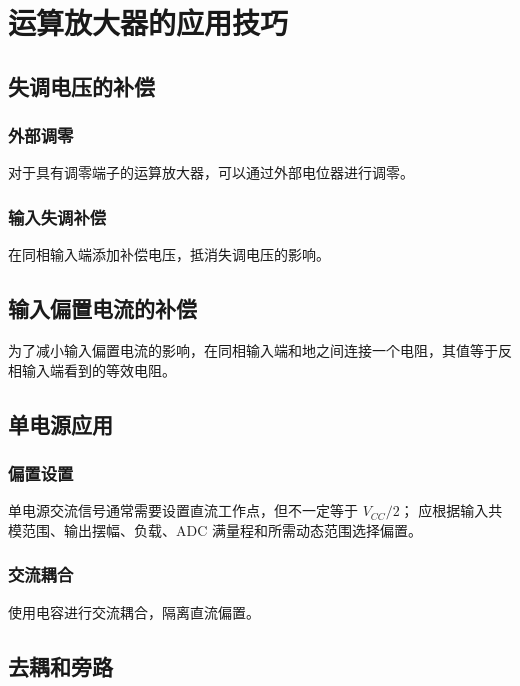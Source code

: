 \section{运算放大器的应用技巧}

\subsection{失调电压的补偿}

\subsubsection{外部调零}

对于具有调零端子的运算放大器，可以通过外部电位器进行调零。

\subsubsection{输入失调补偿}

在同相输入端添加补偿电压，抵消失调电压的影响。

\subsection{输入偏置电流的补偿}

为了减小输入偏置电流的影响，在同相输入端和地之间连接一个电阻，其值等于反相输入端看到的等效电阻。

\subsection{单电源应用}

\subsubsection{偏置设置}

单电源交流信号通常需要设置直流工作点，但不一定等于 $V_{CC}/2$；
应根据输入共模范围、输出摆幅、负载、ADC 满量程和所需动态范围选择偏置。

\subsubsection{交流耦合}

使用电容进行交流耦合，隔离直流偏置。

\subsection{去耦和旁路}

